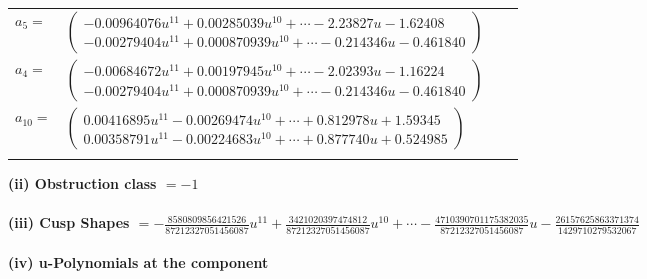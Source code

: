 \documentclass[1p]{elsarticle_modified}
\theoremstyle{definition}
\begin{document}
\begin{tabular}{m{7pt} m{180pt} m{7pt} m{180pt} }
\flushright $a_{5}=$&$\begin{pmatrix}-0.00964076 u^{11}+0.00285039 u^{10}+\cdots-2.23827 u-1.62408\\-0.00279404 u^{11}+0.000870939 u^{10}+\cdots-0.214346 u-0.461840\end{pmatrix}$ \\
\flushright $a_{4}=$&$\begin{pmatrix}-0.00684672 u^{11}+0.00197945 u^{10}+\cdots-2.02393 u-1.16224\\-0.00279404 u^{11}+0.000870939 u^{10}+\cdots-0.214346 u-0.461840\end{pmatrix}$ \\
\flushright $a_{10}=$&$\begin{pmatrix}0.00416895 u^{11}-0.00269474 u^{10}+\cdots+0.812978 u+1.59345\\0.00358791 u^{11}-0.00224683 u^{10}+\cdots+0.877740 u+0.524985\end{pmatrix}$\\&\end{tabular}
\flushleft \textbf{(ii) Obstruction class $= -1$}\\~\\
\flushleft \textbf{(iii) Cusp Shapes $= -\frac{8580809856421526}{87212327051456087} u^{11}+\frac{3421020397474812}{87212327051456087} u^{10}+\cdots-\frac{4710390701175382035}{87212327051456087} u-\frac{26157625863371374}{1429710279532067}$}\\~\\
\newpage\renewcommand{\arraystretch}{1}
\flushleft \textbf{(iv) u-Polynomials at the component}\newline \\
\end{document}

